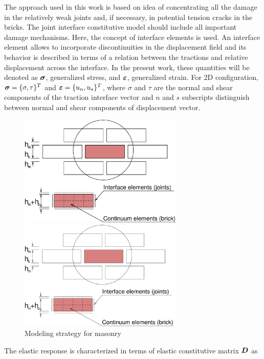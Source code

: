 \documentclass[a4paper]{article}
\newcommand{\mbf}[1]{\mbox{\boldmath$#1$}}
\newcommand{\e}{\mbf{\varepsilon}}
\newcommand{\sig}{\mbf{\sigma}}
\begin{document}
The approach used in this work is based on idea of concentrating all the damage in the relatively weak joints and, if necessary, in potential tension cracks in the bricks. The joint interface constitutive model should include all important damage mechanisms. Here, the  concept of interface elements is used. An interface element allows to incorporate discontinuities in the displacement field and its behavior is described in terms of a relation between the tractions and relative displacement across the interface. In the present work, these quantities will be denoted as $\sig$, generalized stress, and $\e$, generalized strain. For 2D configuration, $\sig=\{\sigma, \tau\}^T$ and $\e=\{u_n, u_s\}^T$, where $\sigma$ and $\tau$ are the normal and shear components of the traction interface vector and  $n$ and $s$ subscripts distinguish between normal and shear components of displacement vector.
\begin{figure}[!htb]
\begin{htmlonly}
  \centerline{\includegraphics[width=0.7\textwidth]{mmodel.eps}}
\end{htmlonly}
 \centerline{\includegraphics[width=0.7\textwidth]{mmodel}}
  \caption{Modeling strategy for masonry}
\end{figure}
The elastic response is characterized in terms of elastic constitutive matrix $\mbf{D}$ as
\end{document}
